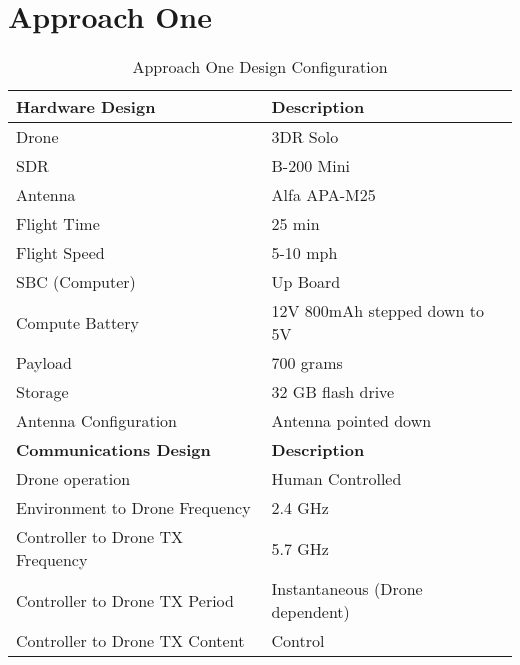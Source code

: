 \section{Approach One}
\begin{table}[h!]
\centering
\caption{Approach One Design Configuration}
\label{table:approach_one}
\begin{tabular}{|l|l|}
    \hline  \textbf{Hardware Design}              & \textbf{Description}                      \\ \hline
            Drone                                 & 3DR Solo                                  \\
            SDR                                   & B-200 Mini                                \\
            Antenna                               & Alfa APA-M25                              \\
            Flight Time                           & 25 min                                    \\
            Flight Speed                          & 5-10 mph                                  \\
            SBC (Computer)                        & Up Board                                  \\
            Compute Battery                       & 12V 800mAh stepped down to 5V             \\
            Payload                               & 700 grams                                 \\
            Storage                               & 32 GB flash drive                         \\
            Antenna Configuration                 & Antenna pointed down                      \\
    \hline  \textbf{Communications Design}        & \textbf{Description}                      \\ \hline
            Drone operation                       & Human Controlled                          \\
            Environment to Drone Frequency        & 2.4 GHz                                   \\
            Controller to Drone TX Frequency      & 5.7 GHz                                   \\
            Controller to Drone TX Period         & Instantaneous (Drone dependent)           \\
            Controller to Drone TX Content        & Control                                   \\

\end{tabular}
\end{table}
